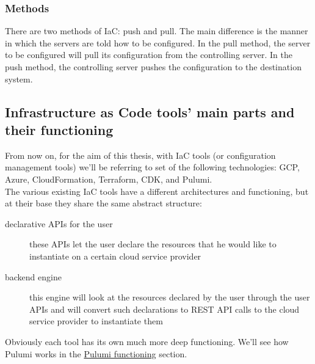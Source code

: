 \subsubsection{Methods}

There are two methods of IaC: push and pull.
The main difference is the manner in which the servers are told how to be configured.
In the pull method, the server to be configured will pull its configuration from the controlling server.
In the push method, the controlling server pushes the configuration to the destination system.

\subsection{Infrastructure as Code tools' main parts and their functioning}
From now on, for the aim of this thesis, with IaC tools (or configuration management tools) we'll be referring to set of the following technologies: \gls{GCP}, \gls{Azure}, \gls{CloudFormation}, \gls{Terraform}, \gls{CDK}, and Pulumi.\\
The various existing IaC tools have a different architectures and functioning, but at their base they share the same abstract structure:
\begin{description}
  \item[declarative APIs for the user] these APIs let the user declare the resources that he would like to instantiate on a certain cloud service provider
  \item[backend engine] this engine will look at the resources declared by the user through the user APIs and will convert such declarations to REST API calls to the cloud service provider to instantiate them 
\end{description}
Obviously each tool has its own much more deep functioning.
We'll see how Pulumi works in the \hyperref[sec:pulumi-functioning]{Pulumi functioning} section.



